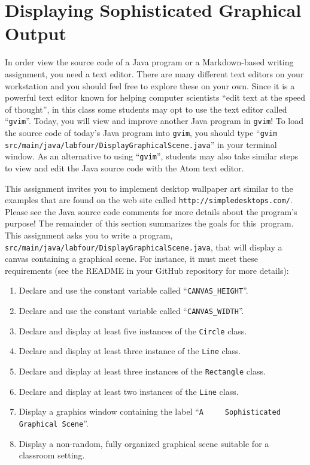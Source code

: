 \documentclass[11pt]{article}
\newcommand{\mainprogramsource}{\lstinline{src/main/java/labfour/DisplayGraphicalScene.java}}
\newcommand{\command}[1]{``\lstinline{#1}''}
\newcommand{\program}[1]{\lstinline{#1}}
\newcommand{\url}[1]{\lstinline{#1}}
\begin{document}
\section*{Displaying Sophisticated Graphical Output}

In order view the source code of a Java program or a Markdown-based writing
assignment, you need a text editor. There are many different text editors on
your workstation and you should feel free to explore these on your own. Since it
is a powerful text editor known for helping computer scientists ``edit text at
the speed of thought'', in this class some students may opt to use the text
editor called \command{gvim}. Today, you will view and improve another Java
program in {\tt gvim}! To load the source code of today's Java program into
\program{gvim}, you should type \command{gvim
src/main/java/labfour/DisplayGraphicalScene.java} in your terminal window. As an
alternative to using \command{gvim}, students may also take similar steps to
view and edit the Java source code with the Atom text editor.

This assignment invites you to implement desktop wallpaper art similar to the
examples that are found on the web site called \url{http://simpledesktops.com/}.
Please see the Java source code comments for more details about the program's
purpose! The remainder of this section summarizes the goals for \mbox{this
program}. This assignment asks you to write a program, \mainprogramsource{},
that will display a canvas containing a graphical scene. For instance, it must
meet these requirements (see the README in your GitHub repository for more
details):

\vspace*{-.1in}
\begin{enumerate}
  \setlength{\itemsep}{0pt}

  \item Declare and use the constant variable called \command{CANVAS_HEIGHT}.

  \item Declare and use the constant variable called \command{CANVAS_WIDTH}.

  \item Declare and display at least five instances of the \program{Circle} class.

  \item Declare and display at least three instance of the \program{Line} class.

  \item Declare and display at least three instances of the \program{Rectangle}
    class.

  \item Declare and display at least two instances of the \program{Line} class.

  \item Display a graphics window containing the label ``\program{A
    Sophisticated Graphical Scene}''.

  \item Display a non-random, fully organized graphical scene suitable for a
    classroom setting.

\end{enumerate}
\end{document}
